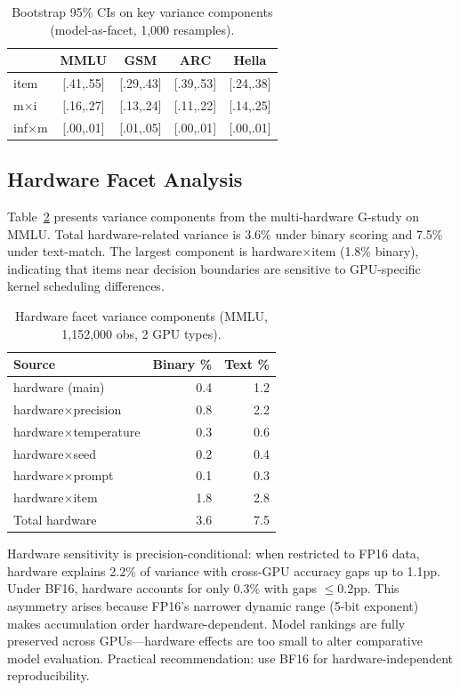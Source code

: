 \documentclass[11pt,twocolumn]{article}
\begin{document}
\begin{table}[t]
\centering
\caption{Bootstrap 95\% CIs on key variance components (model-as-facet, 1,000 resamples).}
\label{tab:bootstrap_ci}
\small
\begin{tabular}{@{}lcccc@{}}
\toprule
 & MMLU & GSM & ARC & Hella \\
\midrule
item & [.41,.55] & [.29,.43] & [.39,.53] & [.24,.38] \\
m$\times$i & [.16,.27] & [.13,.24] & [.11,.22] & [.14,.25] \\
inf$\times$m & [.00,.01] & [.01,.05] & [.00,.01] & [.00,.01] \\
\bottomrule
\end{tabular}
\end{table}

\subsection{Hardware Facet Analysis}
\label{sec:hardware}

Table~\ref{tab:hardware} presents variance components from the multi-hardware G-study on MMLU. Total hardware-related variance is 3.6\% under binary scoring and 7.5\% under text-match. The largest component is hardware$\times$item (1.8\% binary), indicating that items near decision boundaries are sensitive to GPU-specific kernel scheduling differences.

\begin{table}[t]
\centering
\caption{Hardware facet variance components (MMLU, 1,152,000 obs, 2 GPU types).}
\label{tab:hardware}
\small
\begin{tabular}{@{}lrr@{}}
\toprule
Source & Binary \% & Text \% \\
\midrule
hardware (main) & 0.4 & 1.2 \\
hardware$\times$precision & 0.8 & 2.2 \\
hardware$\times$temperature & 0.3 & 0.6 \\
hardware$\times$seed & 0.2 & 0.4 \\
hardware$\times$prompt & 0.1 & 0.3 \\
hardware$\times$item & 1.8 & 2.8 \\
\midrule
Total hardware & 3.6 & 7.5 \\
\bottomrule
\end{tabular}
\end{table}

Hardware sensitivity is precision-conditional: when restricted to FP16 data, hardware explains 2.2\% of variance with cross-GPU accuracy gaps up to 1.1pp. Under BF16, hardware accounts for only 0.3\% with gaps $\leq$0.2pp. This asymmetry arises because FP16's narrower dynamic range (5-bit exponent) makes accumulation order hardware-dependent. Model rankings are fully preserved across GPUs---hardware effects are too small to alter comparative model evaluation. Practical recommendation: use BF16 for hardware-independent reproducibility.
\end{document}
